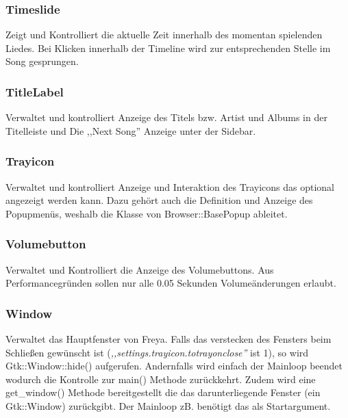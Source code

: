 \subsubsection{Timeslide}
Zeigt und Kontrolliert die aktuelle Zeit innerhalb des momentan spielenden Liedes.
Bei Klicken innerhalb der Timeline wird zur entsprechenden Stelle im Song gesprungen.

\subsubsection{TitleLabel}
Verwaltet und kontrolliert Anzeige des Titels bzw. Artist und Albums in der Titelleiste und Die ,,Next Song'' Anzeige unter der Sidebar.

\subsubsection{Trayicon}
Verwaltet und kontrolliert Anzeige und Interaktion des Trayicons das optional angezeigt werden kann.
Dazu gehört auch die Definition und Anzeige des Popupmenüs, weshalb die Klasse von Browser::BasePopup ableitet.

\subsubsection{Volumebutton}
Verwaltet und Kontrolliert die Anzeige des Volumebuttons. Aus Performancegründen sollen nur alle 0.05 Sekunden Volumeänderungen erlaubt.

\subsubsection{Window}
Verwaltet das Hauptfenster von Freya.
Falls das verstecken des Fensters beim Schließen gewünscht ist (\emph{,,settings.trayicon.totrayonclose''} ist 1), so wird Gtk::Window::hide() aufgerufen.
Andernfalls wird einfach der Mainloop beendet wodurch die Kontrolle zur main() Methode zurückkehrt.
Zudem wird eine get\_window() Methode bereitgestellt die das darunterliegende Fenster (ein Gtk::Window) zurückgibt.
Der Mainloop zB. benötigt das als Startargument.


